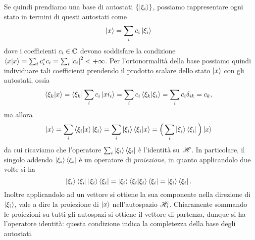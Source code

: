 Se quindi prendiamo una base di autostati $\{\left|{\xi_i}\right\rangle\}$, possiamo rappresentare ogni stato in termini di questi autostati come
\begin{equation}
	\left|{x}\right\rangle=\sum_ic_i\left|{\xi_i}\right\rangle
\end{equation}
dove i coefficienti $c_i\in\mathbb{C}$ devono soddisfare la condizione $\left\langle{x}\middle|{x}\right\rangle=\sum_ic_i^*c_i=\sum_i\left|{c_i}\right|^2<+\infty$.
Per l'ortonormalità della base possiamo quindi individuare tali coefficienti prendendo il prodotto scalare dello stato $\left|{x}\right\rangle$ con gli autostati, ossia
\begin{equation}
	\left\langle{\xi_k}\middle|{x}\right\rangle=\left\langle{\xi_k}\right|\sum_ic_i\left|{xi_i}\right\rangle=\sum_ic_i\left\langle{\xi_k}\middle|{\xi_i}\right\rangle=\sum_ic_i\delta_{ik}=c_k,
\end{equation}
ma allora
\begin{equation}
	\left|{x}\right\rangle=\sum_i\left\langle{\xi_i}\middle|{x}\right\rangle\left|{\xi_i}\right\rangle=\sum_i\left|{\xi_i}\right\rangle\left\langle{\xi_i}\middle|{x}\right\rangle=\Big(\sum_i\left|{\xi_i}\right\rangle\left\langle{\xi_i}\right|\Big)\left|{x}\right\rangle
\end{equation}
da cui ricaviamo che l'operatore $\sum_i\left|{\xi_i}\right\rangle\left\langle{\xi_i}\right|$ è l'identità su $\mathscr H$.
In particolare, il singolo addendo $\left|{\xi_i}\right\rangle\left\langle{\xi_i}\right|$ è un operatore di \emph{proiezione}, in quanto applicandolo due volte si ha
\begin{equation}
	\left|{\xi_i}\right\rangle\left\langle{\xi_i}\right|\left|{\xi_i}\right\rangle\left\langle{\xi_i}\right|=\left|{\xi_i}\right\rangle\left\langle{\xi_i}\middle|{\xi_i}\right\rangle\left\langle{\xi_i}\right|=\left|{\xi_i}\right\rangle\left\langle{\xi_i}\right|.
\end{equation}
Inoltre applicandolo ad un vettore si ottiene la sua componente nella direzione di $\left|{\xi_i}\right\rangle$, vale a dire la proiezione di $\left|{x}\right\rangle$ nell'autospazio $\mathscr H_i$.
Chiaramente sommando le proiezioni su tutti gli autospazi si ottiene il vettore di partenza, dunque si ha l'operatore identità: questa condizione indica la completezza della base degli autostati.


